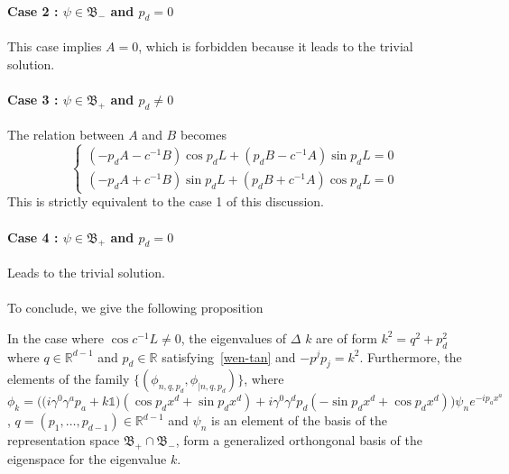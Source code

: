 \paragraph{Case 2 : $\psi \in \mathfrak{B}_-$ and $p_d = 0$}
This case implies $A = 0$, which is forbidden because it leads to the trivial solution.
%
\paragraph{Case 3 : $\psi \in \mathfrak{B}_+$ and $p_d \neq 0$}
The relation between $A$ and $B$ becomes
\begin{equation*}
\begin{cases}
(-p_d A - c^{-1} B)\cos p_d L + (p_d B - c^{-1}A)\sin p_d L = 0  \\
(-p_d A + c^{-1}B)\sin p_d L + (p_d B + c^{-1} A)\cos p_d L = 0 
\end{cases}
\end{equation*}
This is strictly equivalent to the case 1 of this discussion.
%
\paragraph{Case 4 : $\psi \in \mathfrak{B}_+$ and $p_d = 0$}
Leads to the trivial solution. \\\\
To conclude, we give the following proposition
\begin{proposition}
In the case where $\cos c^{-1}L \neq 0$,
the eigenvalues of $\Delta$ $k$ are of form $k^2 = q^2 + p^2_d $ where $q\in\mathbb{R}^{d-1}$ and $p_d\in \mathbb{R}$ satisfying~\cref{wen-tan} and $-p^jp_j = k^2$.
Furthermore, the elements of the family $\{(\phi_{n,q,p_d}, \phi_{|n,q,p_d})\}$, where
\begin{equation*}
\phi_k = \Big(\big(i\gamma^0\gamma^a p_a+k\mathbb{1}\big)(\cos p_d x^d + \sin p_d x^d) +
i\gamma^0\gamma^d p_d(-\sin p_d x^d + \cos p_d x^d)\Big) \psi_n e^{-ip_a x^a}
\end{equation*}
, $q=(p_1,\ldots, p_{d-1})\in\mathbb{R}^{d-1}$ and $\psi_n$ is an element of the basis of the representation space $\mathfrak{B}_+\cap\mathfrak{B}_-$,
form a generalized orthongonal basis of the eigenspace for the eigenvalue $k$.
\end{proposition}



